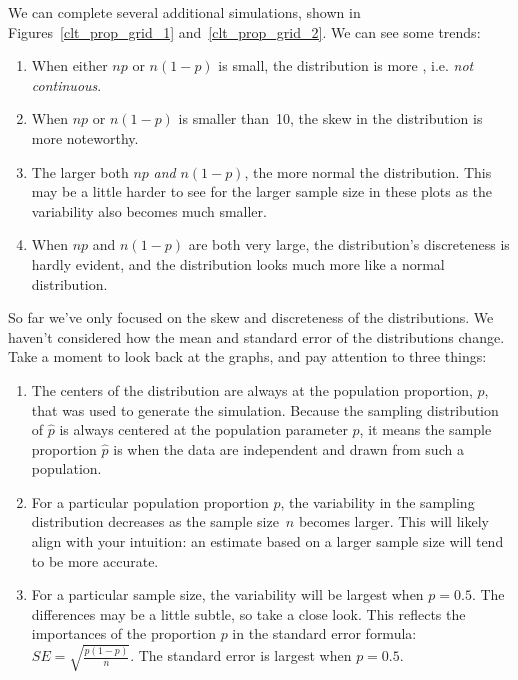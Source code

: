 \pagebreak



We can complete several additional simulations,
shown in
Figures~\ref{clt_prop_grid_1}
and~\ref{clt_prop_grid_2}.
We can see some trends:
\begin{enumerate}
\item When either $np$ or $n(1 - p)$ is small, the
    distribution is more ,
    i.e. \emph{not continuous}.
\item When $np$ or $n(1-p)$ is smaller than~10,
    the skew in the distribution is more noteworthy.
\item The larger both $np$ \emph{and} $n(1 - p)$,
    the more normal the distribution.
    This may be a little harder to see for the larger
    sample size in these plots as the variability
    also becomes much smaller.
\item When $np$ and $n(1 - p)$ are both very large,
    the distribution's discreteness is hardly evident,
    and the distribution looks much more
    like a normal distribution.
\end{enumerate}

So far we've only focused on the skew and discreteness
of the distributions. We haven't considered
how the mean and standard error
of the distributions change.
Take a moment to look back at the graphs,
and pay attention to three things:
\begin{enumerate}
\item The centers of the distribution are always at
    the population proportion, $p$, that was used to
    generate the simulation. Because the sampling
    distribution of $\hat{p}$ is always centered at
    the population parameter $p$, it means the sample
    proportion $\hat{p}$ is  when
    the data are independent and drawn from such
    a population.
\item For a particular population proportion $p$,
    the variability in the sampling distribution
    decreases as the sample size~$n$ becomes larger.
    This will likely align with your intuition:
    an estimate based on a larger sample size will
    tend to be more accurate.
\item For a particular sample size, the variability
    will be largest when $p = 0.5$. The differences
    may be a little subtle, so take a close look.
    This reflects the importances of the proportion
    $p$ in the standard error formula:
    $SE = \sqrt{\frac{p (1 - p)}{n}}$.
    The standard error is largest when $p = 0.5$.
\end{enumerate}


